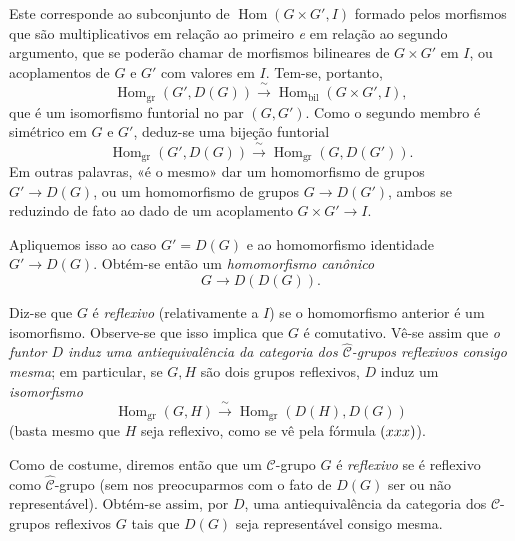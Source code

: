 Este corresponde ao subconjunto de \(\operatorname{Hom}(G\times G',I)\)
formado pelos morfismos que são multiplicativos em relação ao primeiro
\emph{e} em relação ao segundo argumento, que se poderão chamar de morfismos
bilineares de \(G\times G'\) em \(I\), ou acoplamentos de \(G\) e \(G'\)
com valores em \(I\). Tem-se, portanto,
\begin{equation}
  \tag{xx}
  \operatorname{Hom}_{\mathrm{gr}}(G',D(G))
  \xrightarrow{\ \sim\ }
  \operatorname{Hom}_{\mathrm{bil}}(G\times G',I),
\end{equation}
que é um isomorfismo funtorial no par \((G,G')\). Como o segundo membro é simétrico em
\(G\) e \(G'\), deduz-se uma bijeção funtorial
\begin{equation}
  \tag{xxx}
  \operatorname{Hom}_{\mathrm{gr}}(G',D(G))
  \xrightarrow{\ \sim\ }
  \operatorname{Hom}_{\mathrm{gr}}(G,D(G')).
\end{equation}
Em outras palavras, «é o mesmo» dar um homomorfismo de grupos
\(G'\to D(G)\), ou um homomorfismo de grupos \(G\to D(G')\),
ambos se reduzindo de fato ao dado de um acoplamento \(G\times G'\to I\).

Apliquemos isso ao caso \(G'=D(G)\) e ao homomorfismo identidade
\(G'\to D(G)\). Obtém-se então um \emph{homomorfismo canônico}
\begin{equation}
  \tag{xxxx}
  G\longrightarrow D(D(G)).
\end{equation}

Diz-se que \(G\) é \emph{reflexivo} (relativamente a \(I\)) se o
homomorfismo anterior é um isomorfismo. Observe-se que isso implica que
\(G\) é comutativo. Vê-se assim
que \emph{o funtor \(D\) induz uma antiequivalência da categoria dos
\(\widehat{\mathscr C}\)-grupos reflexivos consigo mesma}; em particular,
se \(G,H\) são dois grupos reflexivos, \(D\) induz um \emph{isomorfismo}
\[
  \operatorname{Hom}_{\mathrm{gr}}(G,H)
  \xrightarrow{\ \sim\ }
  \operatorname{Hom}_{\mathrm{gr}}(D(H),D(G))
\]
(basta mesmo que \(H\) seja reflexivo, como se vê pela fórmula
\(\SGARefLink{sga3:viii:eq:1:xxx}{(xxx)}\)).

Como de costume, diremos então que um \(\mathscr C\)-grupo \(G\) é
\emph{reflexivo} se é reflexivo como \(\widehat{\mathscr C}\)-grupo
(sem nos preocuparmos com o fato de \(D(G)\) ser ou não representável).
Obtém-se assim, por \(D\), uma antiequivalência da categoria dos
\(\mathscr C\)-grupos reflexivos \(G\) tais que \(D(G)\) seja
representável consigo mesma.

